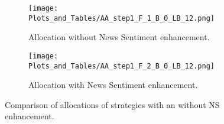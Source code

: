 \newpage
\begin{center}

\begin{figure}[H] %
\centering
\begin{subfigure}{1\textwidth}%
\centering

\texttt{[image: Plots\_and\_Tables/AA\_step1\_F\_1\_B\_0\_LB\_12.png]}
\caption{Allocation without News Sentiment enhancement.} \label{fig:notc_NS_perf}
\end{subfigure}%

\medskip
\begin{subfigure}{1\textwidth}%
\centering
\texttt{[image: Plots\_and\_Tables/AA\_step1\_F\_2\_B\_0\_LB\_12.png]}
\caption{Allocation with News Sentiment enhancement.} \label{fig:tc_NS_perf}
\end{subfigure}%

\caption{Comparison of allocations of strategies with an without NS enhancement.} \label{fig:noNS_perf}
\end{figure}

\end{center}
\newpage